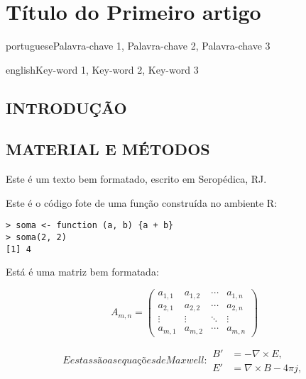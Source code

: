 \artigotrue
\chapter{Título do Primeiro artigo}
\label{chap:chapter01}

\begin{chapterabstract}{portuguese}{Palavra-chave 1, Palavra-chave 2, Palavra-chave 3}
\end{chapterabstract}

\begin{chapterabstract}{english}{Key-word 1, Key-word 2, Key-word 3}
\end{chapterabstract}

\formatchapter

\section{INTRODUÇÃO}

\blindtext[2]

\section{MATERIAL E MÉTODOS}

Este é um texto bem formatado, escrito em Seropédica, RJ. \blindtext[1]

Este é o código fote de uma função construída no ambiente R:

\begin{verbatim}
> soma <- function (a, b) {a + b}
> soma(2, 2)
[1] 4
\end{verbatim}

Está é uma matriz bem formatada:

\begin{equation}
  A_{m,n} =
 \begin{pmatrix}
  a_{1,1} & a_{1,2} & \cdots & a_{1,n} \\
  a_{2,1} & a_{2,2} & \cdots & a_{2,n} \\
  \vdots  & \vdots  & \ddots & \vdots  \\
  a_{m,1} & a_{m,2} & \cdots & a_{m,n}
 \end{pmatrix}
\end{equation}

\begin{subequations}\label{eq:maxwell}
E estas são as equações de Maxwell:
\begin{align}
        B'&=-\nabla \times E,\\
        E'&=\nabla \times B - 4\pi j,
\end{align}
\end{subequations}

